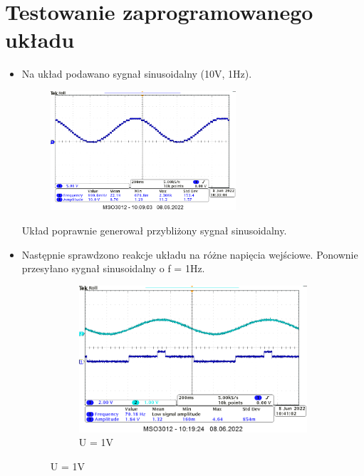 \pagebreak

\section{Testowanie zaprogramowanego układu}

\begin{itemize}
    \item Na układ podawano sygnał sinusoidalny (10V, 1Hz).
        \begin{figure}[H]
            \centering
            \includegraphics[width=0.65\textwidth]{img/3/3_dzialajacy_przetwornik_cropped.png}
            \label{fig:my_label}
        \end{figure}
    Układ poprawnie generował przybliżony sygnał sinusoidalny.
    \item Następnie sprawdzono reakcje układu na różne napięcia wejściowe. Ponownie przesyłano sygnał sinusoidalny o f = 1Hz.
        \begin{figure}[H]
            \centering
            \begin{subfigure}[H]{0.45\textwidth}
                \includegraphics[width=\textwidth]{img/3/3_rozdzielczosc_1V_cropped.png}
                \caption*{U = 1V}

\end{subfigure}
\end{figure}
\end{itemize}
